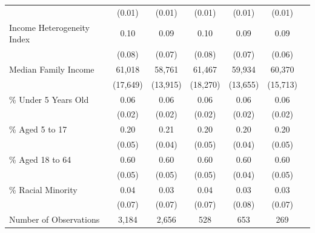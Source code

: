 \begin{longtable}{p{4cm}cccccc}
                    & (0.01) & (0.01) & (0.01) & (0.01) & (0.01) \\
    Income Heterogeneity Index & 0.10 & 0.09 & 0.10 & 0.09 & 0.09 \\[-2.3em]
                                & (0.08) & (0.07) & (0.08) & (0.07) & (0.06) \\
    Median Family Income & 61,018 & 58,761 & 61,467 & 59,934 & 60,370 \\[-2.3em]
                            & (17,649) & (13,915) & (18,270) & (13,655) & (15,713) \\
    \% Under 5 Years Old & 0.06 & 0.06 & 0.06 & 0.06 & 0.06 \\
                            & (0.02) & (0.02) & (0.02) & (0.02) & (0.02) \\
    \% Aged 5 to 17 & 0.20 & 0.21 & 0.20 & 0.20 & 0.20 \\
                    & (0.05) & (0.04) & (0.05) & (0.04) & (0.05) \\
    \% Aged 18 to 64 & 0.60 & 0.60 & 0.60 & 0.60 & 0.60 \\
                        & (0.05) & (0.05) & (0.05) & (0.04) & (0.05) \\
    \% Racial Minority & 0.04 & 0.03 & 0.04 & 0.03 & 0.03 \\
                        & (0.07) & (0.07) & (0.07) & (0.08) & (0.07) \\
    Number of Observations & 3,184 & 2,656 & 528 & 653 & 269 \\

\end{longtable}





